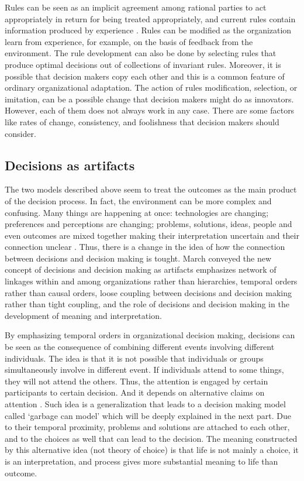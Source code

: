Rules can be seen as an implicit agreement among rational parties to act appropriately in return for being treated appropriately, and current rules contain information produced by experience \cite{2}. Rules can be modified as the organization learn from experience, for example, on the basis of feedback from the environment. The rule development can also be done by selecting rules that produce optimal decisions out of collections of invariant rules. Moreover, it is possible that decision makers copy each other and this is a common feature of ordinary organizational adaptation. The action of rules modification, selection, or imitation, can be a possible change that decision makers might do as innovators. However, each of them does not always work in any case. There are some factors like rates of change, consistency, and foolishness that decision makers should consider.

\subsection{Decisions as artifacts}

The two models described above seem to treat the outcomes as the main product of the decision process. In fact, the environment can be more complex and confusing. Many things are happening at once: technologies are changing; preferences and perceptions are changing; problems, solutions, ideas, people and even outcomes are mixed together making their interpretation uncertain and their connection unclear \cite{2}. Thus, there is a change in the idea of how the connection between decisions and decision making is tought. March conveyed the new concept of decisions and decision making as artifacts emphasizes network of linkages within and among organizations rather than hierarchies, temporal orders rather than causal orders, loose coupling between decisions and decision making rather than tight coupling, and the role of decisions and decision making in the development of meaning and interpretation.

By emphasizing temporal orders in organizational decision making, decisions can be seen as the consequence of combining different events involving different individuals. The idea is that it is not possible that individuals or groups simultaneously involve in different event. If individuals attend to some things, they will not attend the others. Thus, the attention is engaged by certain participants to certain decision. And it depends on alternative claims on attention \cite{2}. Such idea is a generalization that leads to a decision making model called ‘garbage can model’ which will be deeply explained in the next part. Due to their temporal proximity, problems and solutions are attached to each other, and to the choices as well that can lead to the decision. The meaning constructed by this alternative idea (not theory of choice) is that life is not mainly a choice, it is an interpretation, and process gives more substantial meaning to life than outcome.

